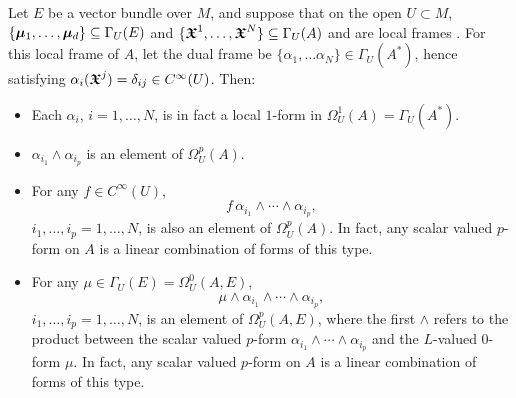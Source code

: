 \begin{example}
Let $E$ be a vector bundle over $M$, and suppose that on the open $U \subset M$, $\{\bm{\mu}_1, \dots, \bm{\mu}_d\} \subseteq \Gamma_U(E)$ and $\{\bm{\mathfrak{X}}^1, \dots, \bm{\mathfrak{X}}^N\} \subseteq \Gamma_U(A)$ and  are local frames
. For this local frame of $A$, let the dual frame be $\{\alpha_1, \dots \alpha_N\} \in \Gamma_U(A^*)$, hence satisfying $\alpha_i(\bm{\mathfrak{X}}^j) = \delta_{ij} \in C^\infty(U)$. Then:

    \begin{itemize}
        
    \item Each $\alpha_i$, $i = 1, \dots, N$, is in fact a local $1$-form in $\Omega_U^1(A) = \Gamma_U(A^*)$.
    
    \item $\alpha_{i_1} \wedge \alpha_{i_p}$ is an element of $\Omega_U^p(A)$.
    
    \item For any $f \in C^\infty(U)$, 
    \begin{equation}
        f\, \alpha_{i_1} \wedge \cdots \wedge \alpha_{i_p},
    \end{equation} 
    $i_1, \dots, i_p = 1, \dots, N$, is also an element of $\Omega_U^p(A)$. In fact, any scalar valued $p$-form on $A$ is a linear combination of forms of this type.
    
    \item For any $\mu \in \Gamma_U(E) = \Omega_U^0(A, E)$, 
    \begin{equation}
        \mu \wedge \alpha_{i_1} \wedge \cdots \wedge \alpha_{i_p},
    \end{equation}
    $i_1, \dots, i_p = 1, \dots, N$, is an element of $\Omega_U^p(A, E)$, where the first $\wedge$ refers to the product between the scalar valued $p$-form $\alpha_{i_1} \wedge \cdots \wedge \alpha_{i_p}$ and the $L$-valued $0$-form $\mu$. In fact, any scalar valued $p$-form on $A$ is a linear combination of forms of this type.
        
    \end{itemize}
\end{example}



